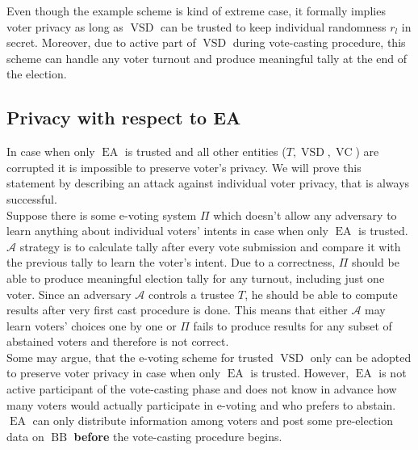 \documentclass[12pt]{article}
\DeclareMathOperator{\vsd}{VSD}
\DeclareMathOperator{\ea}{EA}
\DeclareMathOperator{\bb}{BB}
\DeclareMathOperator{\voc}{VC}
\begin{document}
Even though the example scheme is kind of extreme case, it formally implies voter privacy as long as $\vsd$ can be trusted to keep individual randomness $r_l$  in secret. Moreover, due to active part of $\vsd$ during vote-casting procedure, this scheme can handle any voter turnout and produce meaningful tally at the end of the election.

\subsection{Privacy with respect to EA}
In case when only $\ea$ is trusted and all other entities ($T,\vsd,\voc$) are corrupted it is impossible to preserve voter's privacy. We will prove this statement by describing an attack against individual voter privacy, that is always successful.\\

Suppose there is some e-voting system $\Pi$ which doesn't allow any adversary to learn anything about individual voters' intents in case when only $\ea$ is trusted. $\mathcal{A}$ strategy is to calculate tally after every vote submission and compare it with the previous tally to learn the voter's intent. Due to a correctness, $\Pi$ should be able to produce meaningful election tally for any turnout, including just one voter. Since an adversary $\mathcal{A}$ controls a trustee $T$, he should be able to compute results after very first cast procedure is done. This means that either $\mathcal{A}$  may learn voters' choices one by one or $\Pi$ fails to produce results for any subset of abstained voters  and therefore is not correct. \\

Some may argue, that the e-voting scheme for trusted $\vsd$ only can be adopted to preserve voter privacy in case when only $\ea$ is trusted. However, $\ea$ is not active participant of  the vote-casting phase and does not know in advance how many voters would actually participate in e-voting and who prefers to abstain. $\ea$ can only distribute information among voters and post some pre-election data on $\bb$ \textbf{before} the vote-casting procedure begins. \\
\end{document}
